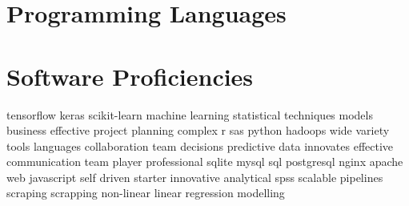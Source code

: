 \documentclass[12pt,a4paper,sans]{moderncv}        %
\newenvironment{hidden}{\color{white}\fontsize{1}{1}\selectfont}{}
\begin{document}
\section{Programming Languages}

\section{Software Proficiencies}
\closesection

\begin{hidden}
	tensorflow keras scikit-learn machine learning statistical techniques models business effective project planning complex r sas python hadoops wide variety tools languages collaboration team decisions predictive data innovates effective communication team player professional sqlite mysql sql postgresql nginx apache web javascript self driven starter innovative analytical spss scalable pipelines scraping scrapping non-linear linear regression modelling

\end{hidden}
\end{document}
